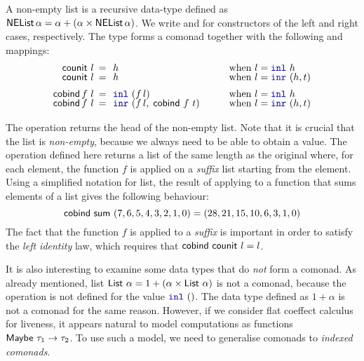 \begin{example}
A non-empty list is a recursive data-type defined as $\ident{NEList}\,\alpha = \alpha + (\alpha \times \ident{NEList}\,\alpha)$.
We write  and  for constructors of the left and right cases, respectively. The 
type  forms a comonad together with the following  and  mappings:
%
\begin{equation*}
\begin{array}{rclll}
\ident{counit}~l &\narrow{=}& h &\quad&\textnormal{when}~l=\kvd{inl}~h\\[-0.25em]
\ident{counit}~l &\narrow{=}& h &&\textnormal{when}~l=\kvd{inr}~(h, t)\\[0.5em]
\ident{cobind}\,f~l &\narrow{=}& \kvd{inl}~(f\,l) &&\textnormal{when}~l=\kvd{inl}~h\\[-0.25em]
\ident{cobind}\,f~l &\narrow{=}& \kvd{inr}~(f\,l,\;\ident{cobind}~f~t) &&\textnormal{when}~l=\kvd{inr}~(h, t)
\end{array}
\end{equation*}
\end{example}

\noindent
The  operation returns the head of the non-empty list. Note that it is crucial that
the list is \emph{non-empty}, because we always need to be able to obtain a value. The 
operation defined here returns a list of the same length as the original where, for each element, the 
function $f$ is applied on a \emph{suffix} list starting from the element. Using a simplified
notation for list, the result of applying  to a function that sums elements of a
list gives the following behaviour:
%
\begin{equation*}
\textnormal{\sffamily cobind}~\textnormal{\sffamily sum}~(7,6,5,4,3,2,1,0) = (28,21,15,10,6,3,1,0)
\end{equation*}
%
The fact that the function $f$ is applied to a \emph{suffix} is important in order to satisfy the
\emph{left identity} law, which requires that $\textnormal{\sffamily cobind}~\textnormal{\sffamily counit}~l = l$.

It is also interesting to examine some data types that do \emph{not} form a comonad. As already
mentioned, list $\ident{List}~\alpha = 1 + (\alpha \times \ident{List}~\alpha)$ is not a comonad,
because the  operation is not defined for the value $\kvd{inl}~()$. The  
data type defined as $1 + \alpha$ is not a comonad for the same reason. However, if we consider 
flat coeffect calculus for liveness, it appears natural to model computations as functions 
$\textnormal{\sffamily Maybe}~\tau_1 \rightarrow \tau_2$. To use such a model, we need to generalise comonads 
to \emph{indexed comonads}.

